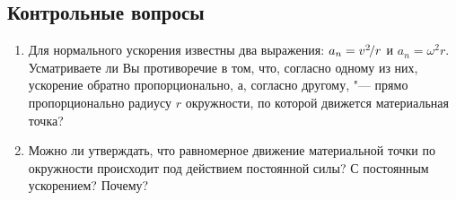 \documentclass[a4paper, 12pt]{extarticle}
\begin{document}
\subsection{Контрольные вопросы}
\begin{enumerate}
\item Для нормального ускорения известны два выражения: $a_n = v^2\kern-.15em/r$ и $a_n = \omega^2 r$. Усматриваете ли Вы противоречие в том, что, согласно одному из них, ускорение обратно пропорционально, а, согласно другому, "--- прямо пропорционально радиусу $r$ окружности, по которой движется материальная точка? %
\item Можно ли утверждать, что равномерное движение материальной точки по окружности происходит под действием постоянной силы? С постоянным ускорением? Почему?
\end{enumerate}
\end{document}
